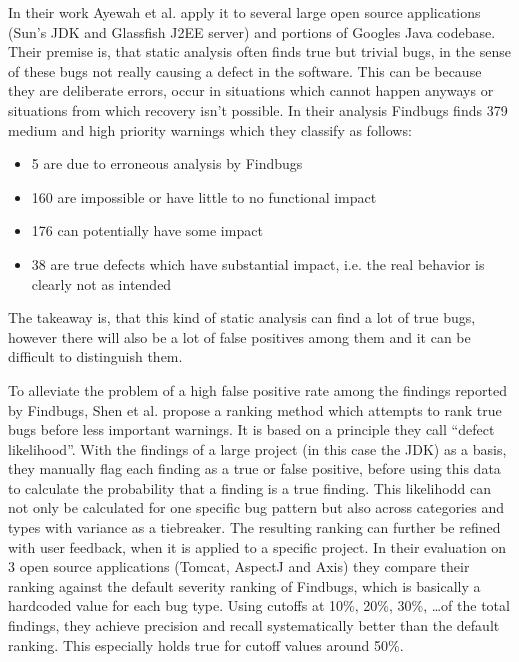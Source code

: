 In their work Ayewah et al. \cite{ayewah2007evaluating} apply it to several large open source applications (Sun's JDK and Glassfish J2EE server) and portions of Googles Java codebase.
Their premise is, that static analysis often finds true but trivial bugs, in the sense of these bugs not really causing a defect in the software.
This can be because they are deliberate errors, occur in situations which cannot happen anyways or situations from which recovery isn't possible.
In their analysis Findbugs finds 379 medium and high priority warnings which they classify as follows:
\begin{itemize}
    \item 5 are due to erroneous analysis by Findbugs
    \item 160 are impossible or have little to no functional impact
    \item 176 can potentially have some impact
    \item 38 are true defects which have substantial impact, i.e. the real behavior is clearly not as intended
\end{itemize}
The takeaway is, that this kind of static analysis can find a lot of true bugs, however there will also be a lot of false positives among them and it can be difficult to distinguish them.

To alleviate the problem of a high false positive rate among the findings reported by Findbugs, Shen et al. \cite{shen2011efindbugs} propose a ranking method which attempts to rank true bugs before less important warnings.
It is based on a principle they call ``defect likelihood''.
With the findings of a large project (in this case the JDK) as a basis, they manually flag each finding as a true or false positive, before using this data to calculate the probability that a finding is a true finding.
This likelihodd can not only be calculated for one specific bug pattern but also across categories and types with variance as a tiebreaker.
The resulting ranking can further be refined with user feedback, when it is applied to a specific project.
In their evaluation on 3 open source applications (Tomcat, AspectJ and Axis) they compare their ranking against the default severity ranking of Findbugs, which is basically a hardcoded value for each bug type.
Using cutoffs at 10\%, 20\%, 30\%, \ldots of the total findings, they achieve precision and recall systematically better than the default ranking.
This especially holds true for cutoff values around 50\%.



